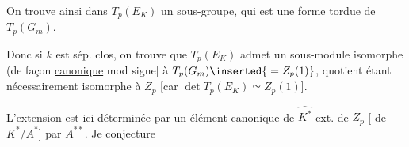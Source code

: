 On trouve ainsi dans $T_p(E_K)$ un sous-groupe, qui est une forme  tordue de $T_p(G_m)$.

Donc si $k$ est sép. clos, on trouve que $T_p(E_K)$ admet un sous-module isomorphe (de façon \uline{canonique} mod signe] à $T_p(G_m)\inserted{{}=Z_p(1)}$, quotient étant nécessairement isomorphe à $Z_p$ [car $\det T_p(E_K)\simeq Z_p(1)$].

L'extension est ici déterminée par un élément canonique de $\widehat{K^*}$ ext. de $Z_p$ [ de $K^*/A^*$] par $A^{**}$. Je conjecture

